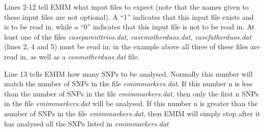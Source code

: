 \documentclass[a4paper,12pt]{article}
\begin{document}
Lines 2-12 tell EMIM what input files to expect (note that the names given to these input files are not optional). A ``1'' indicates that this input file exists and is to be read in, while a ``0'' indicates that this input file is not to be read in. At least one of the files {\it caseparenttrios.dat}, {\it casemotherduos.dat}, {\it casefatherduos.dat} (lines 2, 4 and 5) must be read in; in the example above all three of these files are read in, as well as a {\it conmotherduos.dat} file. 

Line 13 tells EMIM how many SNPs to be analysed. Normally this number will match the number of SNPs in the file {\it emimmarkers.dat}. If this number n is less than the number of SNPs in the file {\it emimmarkers.dat}, then only the first n SNPs in the file {\it emimmarkers.dat} will be analysed. If this number n is greater than the number of SNPs in the file {\it emimmarkers.dat}, then EMIM will simply stop after it has analysed all the SNPs listed in {\it emimmarkers.dat} 
\end{document}
